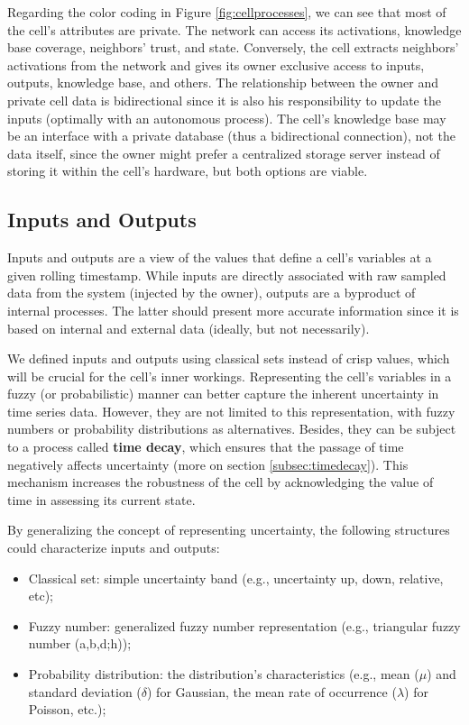 Regarding the color coding in Figure \ref{fig:cellprocesses}, we can see that most of the cell's attributes are private. The network can access its activations, knowledge base coverage, neighbors' trust, and state. Conversely, the cell extracts neighbors' activations from the network and gives its owner exclusive access to inputs, outputs, knowledge base, and others. The relationship between the owner and private cell data is bidirectional since it is also his responsibility to update the inputs (optimally with an autonomous process). The cell's knowledge base may be an interface with a private database (thus a bidirectional connection), not the data itself, since the owner might prefer a centralized storage server instead of storing it within the cell's hardware, but both options are viable.

\subsection{Inputs and Outputs} \label{subsec:inout}

Inputs and outputs are a view of the values that define a cell's variables at a given rolling timestamp. While inputs are directly associated with raw sampled data from the system (injected by the owner), outputs are a byproduct of internal processes. The latter should present more accurate information since it is based on internal and external data (ideally, but not necessarily).

We defined inputs and outputs using classical sets instead of crisp values, which will be crucial for the cell's inner workings. Representing the cell's variables in a fuzzy (or probabilistic) manner can better capture the inherent uncertainty in time series data. However, they are not limited to this representation, with fuzzy numbers or probability distributions as alternatives. Besides, they can be subject to a process called \textbf{time decay}, which ensures that the passage of time negatively affects uncertainty (more on section \ref{subsec:timedecay}). This mechanism increases the robustness of the cell by acknowledging the value of time in assessing its current state.

By generalizing the concept of representing uncertainty, the following structures could characterize inputs and outputs:

\begin{itemize}
    \item Classical set: simple uncertainty band (e.g., uncertainty up, down, relative, etc);
    \item Fuzzy number: generalized fuzzy number representation \cite{Zhang2019} (e.g., triangular fuzzy number (a,b,d;h));
    \item Probability distribution: the distribution's characteristics (e.g., mean ($\mu$) and standard deviation ($\delta$) for Gaussian, the mean rate of occurrence ($\lambda$) for Poisson, etc.);
\end{itemize}

